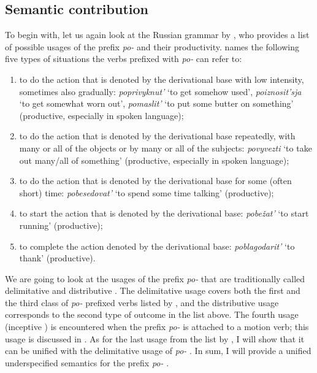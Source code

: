 \subsection{Semantic contribution} To begin with, let us again look at the Russian grammar by \citet{Shvedova:82}, who provides a list of possible usages of the prefix \textit{po-}   and their productivity. \citet[364--365]{Shvedova:82} names the following five types of situations the verbs prefixed with \textit{po-}   can refer to:
\begin{enumerate}
\item to do the action that is denoted by the derivational base with low intensity, sometimes also gradually: \textit{poprivyknut'} `to get somehow used', \textit{po\-izno\-sit'sja} `to get somewhat worn out', \textit{pomaslit'} `to put some butter on something'  (productive, especially in spoken language);
\item to do the action that is denoted by the derivational base repeatedly, with many or all of the objects or by many or all of the subjects: \textit{povyvezti} `to take out many/all of something' (productive, especially in spoken language);
\item to do the action that is denoted by the derivational base for some (often short) time: \textit{pobesedovat'} `to spend some time talking' (productive);
\item to start the action that is denoted by the derivational base: \textit{pobe\v{z}at'} `to start running' (productive);
\item to complete the action denoted by the derivational base: \textit{poblagodarit'} `to thank' (productive).
\end{enumerate}

We are going to look at the usages of the prefix \textit{po-}   that are traditionally called delimitative  and distributive . The delimitative  usage covers both the first and the third class of \textit{po-}  prefixed verbs listed by \citet{Shvedova:82}, and the distributive  usage corresponds to the second type of outcome in the list above. The fourth usage (inceptive ) is encountered when the prefix \textit{po-}   is attached to a motion verb; this usage is discussed in \citealt{ZinovaOsswald:paper}. As for the last usage from the list by \citet{Shvedova:82}, I will show that it can be unified with the delimitative  usage of \textit{po-}  . In sum, I will provide a unified underspecified semantics for the prefix \textit{po-}  .

